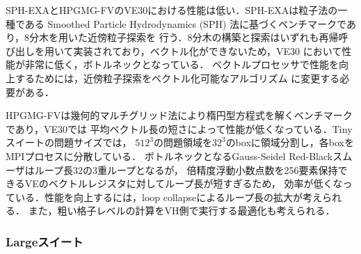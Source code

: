 ﻿\documentclass[submit,techrep,noauthor]{ipsj}
\begin{document}
SPH-EXAとHPGMG-FVのVE30における性能は低い．SPH-EXAは粒子法の一種である
Smoothed Particle Hydrodynamics (SPH) 法に基づくベンチマークであり，8分木を用いた近傍粒子探索を
行う．8分木の構築と探索はいずれも再帰呼び出しを用いて実装されており，ベクトル化ができないため，VE30
において性能が非常に低く，ボトルネックとなっている．
ベクトルプロセッサで性能を向上するためには，近傍粒子探索をベクトル化可能なアルゴリズム
に変更する必要がある．

HPGMG-FVは幾何的マルチグリッド法により楕円型方程式を解くベンチマークであり，VE30では
平均ベクトル長の短さによって性能が低くなっている．Tinyスイートの問題サイズでは，
$512^3$の問題領域を$32^3$のboxに領域分割し，各boxをMPIプロセスに分散している．
ボトルネックとなるGauss-Seidel Red-Blackスムーザはループ長32の3重ループとなるが，
倍精度浮動小数点数を256要素保持できるVEのベクトルレジスタに対してループ長が短すぎるため，
効率が低くなっている．性能を向上するには，loop collapseによるループ長の拡大が考えられる．
また，粗い格子レベルの計算をVH側で実行する最適化も考えられる．

\subsubsection{Largeスイート}
\end{document}
